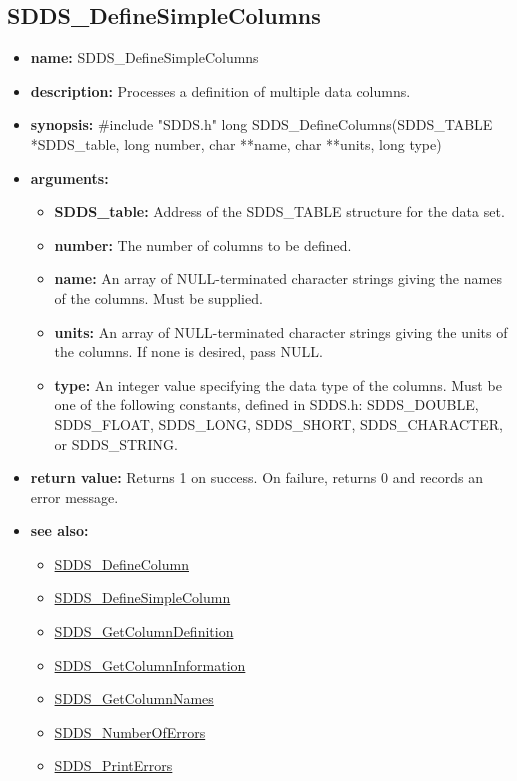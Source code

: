 \documentclass[11pt]{article}
\newcommand{\progref}[1]{\hyperref{SDDS_#1}{{\tt SDDS\_#1} (}{)}{SDDS_#1}}
\begin{document}
\subsection{SDDS\_DefineSimpleColumns}
\label{SDDS_DefineSimpleColumns}

\begin{itemize}
\item {\bf name:}\newline
SDDS\_DefineSimpleColumns
\item {\bf description:}\newline
Processes a definition of multiple data columns.
\item {\bf synopsis:} \#include "SDDS.h"\newline
long SDDS\_DefineColumns(SDDS\_TABLE *SDDS\_table, long number, char **name, char **units, long type)
\item {\bf arguments:}
\begin{itemize}
\item {\bf SDDS\_table:} Address of the SDDS\_TABLE structure for the data set.
\item {\bf number:} The number of columns to be defined.
\item {\bf name:} An array of NULL-terminated character strings giving the names of the columns. Must be supplied.
\item {\bf units:} An array of NULL-terminated character strings giving the units of the columns. If none is desired, pass NULL.
\item {\bf type:} An integer value specifying the data type of the columns. Must be one of the following constants, defined in  SDDS.h: SDDS\_DOUBLE, SDDS\_FLOAT, SDDS\_LONG, SDDS\_SHORT, SDDS\_CHARACTER, or SDDS\_STRING.
\end{itemize}
\item {\bf return value:}\newline
Returns 1 on success. On failure, returns 0 and records an error message.
\item {\bf see also:}
\begin{itemize}
\item \progref{DefineColumn}
\item \progref{DefineSimpleColumn}
\item \progref{GetColumnDefinition}
\item \progref{GetColumnInformation}
\item \progref{GetColumnNames}
\item \progref{NumberOfErrors}
\item \progref{PrintErrors}
\end{itemize}
\end{itemize}
\end{document}
